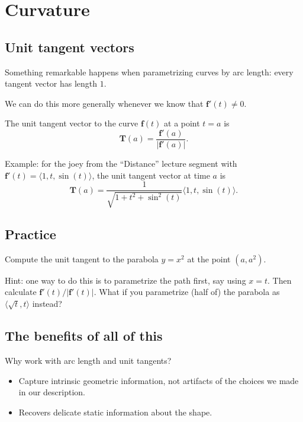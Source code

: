 \documentclass[]{article}
\begin{document}
\section{Curvature}\label{curvature}

\subsection{Unit tangent vectors}\label{unit-tangent-vectors}

Something remarkable happens when parametrizing curves by arc length:
every tangent vector has length $1$.

We can do this more generally whenever we know that
$\mathbf f'(t)\neq 0$.

The unit tangent vector to the curve $\mathbf f(t)$ at a point $t=a$ is
\[\mathbf T(a)=\frac{\mathbf f'(a)}{|\mathbf
f'(a)|}.\]

Example: for the joey from the ``Distance'' lecture segment with
$\mathbf f'(t)=\langle 1,t,\sin(t)\rangle$, the unit tangent vector at
time $a$ is \[\mathbf
T(a)=\frac{1}{\sqrt{1+t^2+\sin^2(t)}}\langle 1,t,\sin(t)
\rangle.\]

\subsection{Practice}\label{practice}

Compute the unit tangent to the parabola $y=x^2$ at the point $(a,a^2)$.

Hint: one way to do this is to parametrize the path first, say using
$x=t$. Then calculate $\mathbf f'(t)/|\mathbf f'(t)|$. What if you
parametrize (half of) the parabola as $\langle\sqrt t,t\rangle$ instead?

\subsection{The benefits of all of
this}\label{the-benefits-of-all-of-this}

Why work with arc length and unit tangents?

\begin{itemize}
\itemsep1pt\parskip0pt
\item
  Capture intrinsic geometric information, not artifacts of the choices
  we made in our description.
\item
  Recovers delicate static information about the shape.
\end{itemize}
\end{document}
